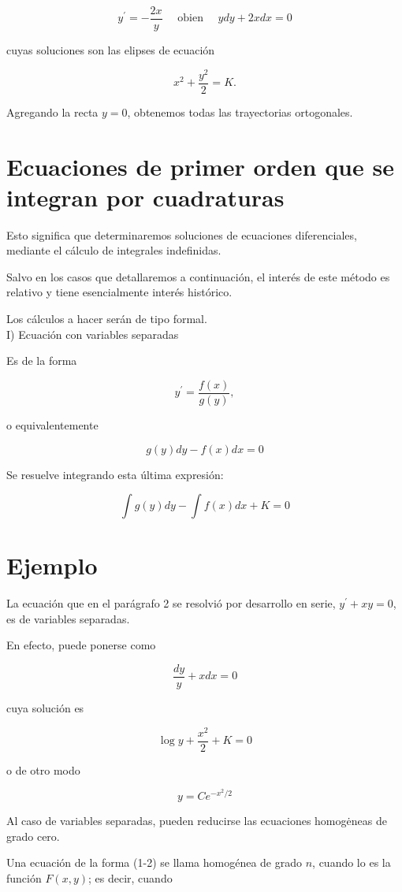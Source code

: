 \documentclass[10pt]{article}
\theoremstyle{plain}
\theoremstyle{definition}
\theoremstyle{remark}
\begin{document}
$$
y^{\prime}=-\frac{2 x}{y} \quad \text { obien } \quad y d y+2 x d x=0
$$

cuyas soluciones son las elipses de ecuación

$$
x^{2}+\frac{y^{2}}{2}=K .
$$

Agregando la recta $y=0$, obtenemos todas las trayectorias ortogonales.

\section{Ecuaciones de primer orden que se integran por cuadraturas}
Esto significa que determinaremos soluciones de ecuaciones diferenciales, mediante el cálculo de integrales indefinidas.

Salvo en los casos que detallaremos a continuación, el interés de este método es relativo y tiene esencialmente interés histórico.

Los cálculos a hacer serán de tipo formal.\\
I) Ecuación con variables separadas

Es de la forma


\begin{equation*}
y^{\prime}=\frac{f(x)}{g(y)}, \tag{4-1}
\end{equation*}


o equivalentemente

$$
g(y) d y-f(x) d x=0
$$

Se resuelve integrando esta última expresión:

$$
\int g(y) d y-\int f(x) d x+K=0
$$

\section*{Ejemplo}
La ecuación que en el parágrafo 2 se resolvió por desarrollo en serie, $y^{\prime}+x y=0$, es de variables separadas.

En efecto, puede ponerse como

$$
\frac{d y}{y}+x d x=0
$$

cuya solución es

$$
\log y+\frac{x^{2}}{2}+K=0
$$

o de otro modo

$$
y=C e^{-x^{2} / 2}
$$

Al caso de variables separadas, pueden reducirse las ecuaciones homogėneas de grado cero.

Una ecuación de la forma (1-2) se llama homogénea de grado $n$, cuando lo es la función $F(x, y)$; es decir, cuando
\end{document}
